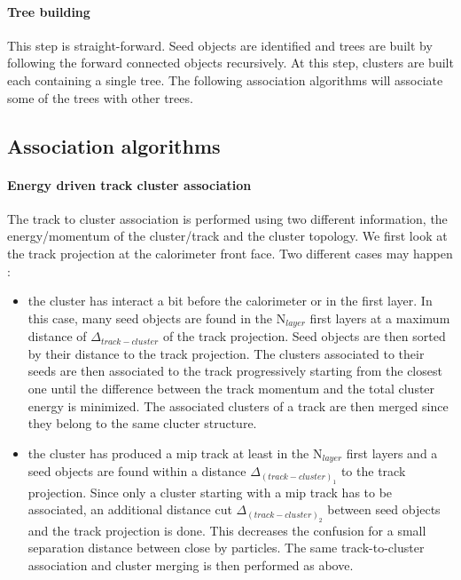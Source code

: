 \documentclass[cits]{JINST}
\begin{document}
\paragraph*{Tree building} This step is straight-forward. Seed objects are identified and trees are built by following the forward connected objects recursively. At this step, clusters are built each containing a single tree. The following association algorithms will associate some of the trees with other trees.

\subsection{Association algorithms}

\paragraph*{Energy driven track cluster association} The track to cluster association is performed using two different information, the energy/momentum of the cluster/track and the cluster topology. We first look at the track projection at the calorimeter front face. Two different cases may happen :

\begin{itemize}
  \item the cluster has interact a bit before the calorimeter or in the first layer. In this case, many seed objects are found in the N$_{layer}$ first layers at a maximum distance of $\Delta_{track-cluster}$ of the track projection. Seed objects are then sorted by their distance to the track projection. The clusters associated to their seeds are then associated to the track progressively starting from the closest one until the difference between the track momentum and the total cluster energy is minimized. The associated clusters of a track are then merged since they belong to the same clucter structure.
  \item the cluster has produced a mip track at least in the N$_{layer}$ first layers and a seed objects are found within a distance $\Delta_{(track-cluster)_1}$ to the track projection. Since only a cluster starting with a mip track has to be associated, an additional distance cut $\Delta_{(track-cluster)_2}$ between seed objects and the track projection is done. This decreases the confusion for a small separation distance between close by particles. The same track-to-cluster association and cluster merging is then performed as above.
\end{itemize}
\end{document}
